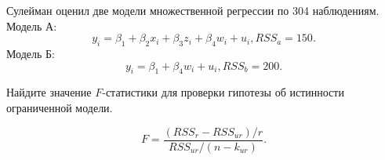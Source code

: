 
\begin{question}
Сулейман оценил две модели множественной регрессии по 304 наблюдениям.
Модель А:
\[
y_i = \beta_1 + \beta_2 x_i + \beta_3 z_i + \beta_4 w_i + u_i, RSS_a = 150.
\]
Модель Б:
\[
y_i = \beta_1 + \beta_4 w_i + u_i, RSS_b = 200.
\]

Найдите значение \(F\)-статистики для проверки гипотезы об истинности ограниченной модели.
\end{question}

\begin{solution}
\[
F = \frac{(RSS_r - RSS_{ur}) / r}{RSS_{ur} / (n - k_{ur})}.
\]
\end{solution}

